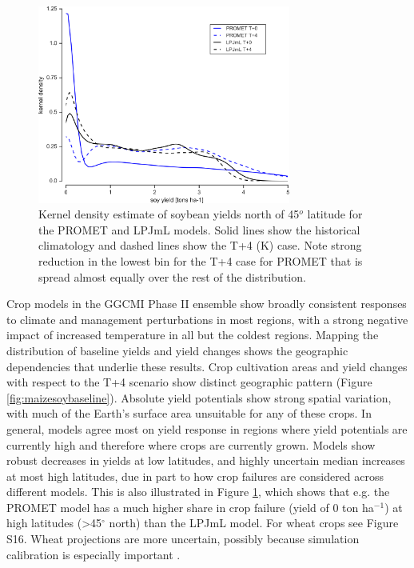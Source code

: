 \documentclass[gmd, manuscript]{copernicus} %
\begin{document}
\begin{figure}[ht]
\centering
   \includegraphics[width=8.3cm]{figures/testhighlatskde.png}
\caption{Kernel density estimate of soybean yields north of 45$^o$ latitude for the PROMET and LPJmL models. Solid lines show the historical climatology and dashed lines show the T+4 (K) case. Note strong reduction in the lowest bin for the T+4 case for PROMET that is spread almost equally over the rest of the distribution.}
\label{fig:highlat}
\end{figure}


Crop models in the GGCMI Phase II ensemble show broadly consistent responses to climate and management perturbations in most regions, with a strong negative impact of increased temperature in all but the coldest regions. 
Mapping the distribution of baseline yields and yield changes shows the geographic dependencies that underlie these results. Crop cultivation areas and yield changes with respect to the T+4 scenario show distinct geographic pattern (Figure \ref{fig:maizesoybaseline}). 
Absolute yield potentials show strong spatial variation, with much of the Earth's surface area unsuitable for any of these crops. 
In general, models agree most on yield response in regions where yield potentials are currently high and therefore where crops are currently grown. 
Models show robust decreases in yields at low latitudes, and highly uncertain median increases at most high latitudes, due in part to how crop failures are considered across different models. 
This is also illustrated in Figure \ref{fig:highlat}, which shows that e.g. the PROMET model has a much higher share in crop failure (yield of 0 ton ha$^{-1}$) at high latitudes (>45$^\circ$ north) than the LPJmL model.
For wheat crops see Figure S16.
Wheat projections are more uncertain, possibly because simulation calibration is especially important \citep[e.g.][]{Asseng2013}.
\end{document}
